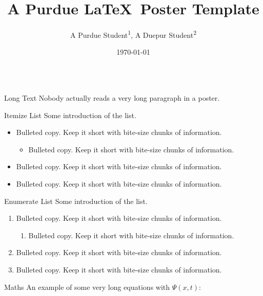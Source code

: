 \documentclass[20pt]{purdue-poster}
\title{\Huge{A Purdue \LaTeX\ Poster Template}}
\author{\large{A Purdue Student\texorpdfstring{\textsuperscript{1}}{}, A Duepur Student\texorpdfstring{\textsuperscript{2}}{}}}
\institute
{\large{Purdue University\texorpdfstring{\textsuperscript{1}}{}, Duepur University\texorpdfstring{\textsuperscript{2}},\\
Appearing at Overleaf Template}}
\date{\today}
\begin{document}
\begin{frame}{}
    \begin{columns}[c]
    \begin{column}{.48\linewidth}
    \begin{block}{\large Long Text}
        Nobody actually reads a very long paragraph in a poster.

        \bigskip

        \lipsum[3]
    \end{block}

    \begin{block}{Itemize List}
        Some introduction of the list.
        \begin{itemize}
            \item Bulleted copy. Keep it short with bite-size chunks of information.
            \begin{itemize}
                \item Bulleted copy. Keep it short with bite-size chunks of information.
            \end{itemize}
            \item Bulleted copy. Keep it short with bite-size chunks of information.
            \item Bulleted copy. Keep it short with bite-size chunks of information.
        \end{itemize}
    \end{block}

    \begin{block}{Enumerate List}
        Some introduction of the list.
        \begin{enumerate}
            \item Bulleted copy. Keep it short with bite-size chunks of information.
            \begin{enumerate}
                \item Bulleted copy. Keep it short with bite-size chunks of information.
            \end{enumerate}
            \item Bulleted copy. Keep it short with bite-size chunks of information.
            \item Bulleted copy. Keep it short with bite-size chunks of information.
        \end{enumerate}
    \end{block}

    \begin{block}{Maths}
        An example of some very long equations with $\Psi (x,t)$:
        

\end{block}
\end{column}
\end{columns}
\end{frame}
\end{document}
